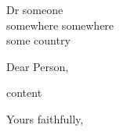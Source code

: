 \documentclass[a4paper,12pt]{myletter}
\begin{document}
\begin{letter}{Dr someone \\
somewhere
somewhere \\
some country}

\onehalfspacing

\opening{Dear Person,}

content

\closing{Yours faithfully,
}
\end{letter}
\end{document}
